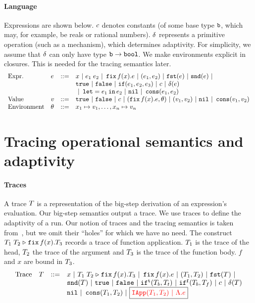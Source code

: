 \documentclass[a4paper,11pt]{article}
\theoremstyle{definition}
\begin{document}
\paragraph{Language}
Expressions are shown below. $c$ denotes constants (of some base
type $\mathtt{b}$, which may, for example, be reals or rational
numbers). $\delta$ represents a primitive operation (such as a
mechanism), which determines adaptivity. For simplicity, we assume
that $\delta$ can only have type $\mathtt{b} \to \mathtt{bool}$. We make
environments explicit in closures. This is needed for the tracing
semantics later.
\[\begin{array}{llll}
\mbox{Expr.} & \expr & ::= & x ~|~ \expr_1 \eapp \expr_2 ~|~ \efix f(x).\expr
 ~|~ (\expr_1, \expr_2) ~|~ \eprojl(\expr) ~|~ \eprojr(\expr) ~| \\
%
& & & \etrue ~|~ \efalse ~|~ \eif(\expr_1, \expr_2, \expr_3) ~|~
\econst ~|~ \eop(\expr) \\
& & & ~|~ \elet  = \expr_1 \ein \expr_2 ~|~ \enil ~|~  \econs (
      \expr_1, \expr_2) \\
%
\mbox{Value} & \valr & ::= & \etrue ~|~ \efalse ~|~ \econst ~|~
(\efix f(x).\expr, \env) ~|~ (\valr_1, \valr_2) 
    ~|~ \enil ~|~ \econs (\valr_1, \valr_2) \\
%
\mbox{Environment} & \env & ::= & x_1 \mapsto \valr_1, \ldots, x_n \mapsto \valr_n
\end{array}\]





\section{Tracing operational semantics and adaptivity}

\paragraph{Traces}
A trace $T$ is a representation of the big-step derivation of an
expression's evaluation. Our big-step semantics output a trace. We use
traces to define the adaptivity of a run. Our notion of traces and the
tracing semantics is taken from~\cite[Section 4]{perera:dep}, but we
omit their ``holes'' for which we have no need. The construct
$T_1 \; T_2 \mathrel{\triangleright} {\mathop{\mathtt{fix}} f(x).T_3}$ records a trace of function
application. $T_1$ is the trace of the head, $T_2$ the trace of
the argument and $T_3$ is the trace of the function body. $f$ and
$x$ are bound in $T_3$.
%
\[\begin{array}{llll}
\mbox{Trace} & \tr & ::= & x ~|~ \trapp{\tr_1}{\tr_2}{f}{x}{\tr_3} ~|~
\trfix f(x).e ~|~ (\tr_1, \tr_2) ~|~ \trprojl(\tr) ~|\\ 
%
& & & \trprojr(\tr) ~|~ \trtrue ~|~ \trfalse ~|~ \trift(\tr_b, \tr_t)
~|~ \triff(\tr_b, \tr_f) ~|~ \trconst ~|~ \trop(\tr) \\
%
& & & \trnil ~|~ \trcons (\tr_1, \tr_2) ~|~ \boxed{\color{red} \triapp{\tr_1}{\tr_2} ~|~ \eilam \expr}
\end{array}\]
\end{document}
